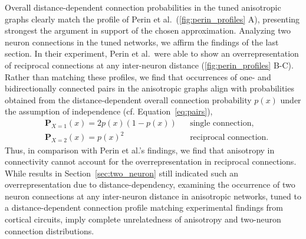 Overall distance-dependent connection probabilities in the tuned
an\-iso\-tro\-pic graphs clearly match the profile of Perin et
al.~(\autoref{fig:perin_profiles} A), presenting strongest the
argument in support of the chosen approximation. Analyzing two neuron
connections  in the tuned
networks, we affirm the findings of the last section. In their
experiment, Perin et al.~were able to show an overrepresentation of
reciprocal connections at any inter-neuron distance
(\autoref{fig:perin_profiles} B-C). Rather than matching these
profiles, we find that occurrences of one- and bidirectionally
connected pairs in the anisotropic graphs align with probabilities
obtained from the distance-dependent overall connection probability
$p(x)$ under the assumption of independence (cf. Equation~\ref{eq:pairs}),
\begin{equation*}
  \label{eq:pairs}
  \begin{aligned}%
    & \mathbf{P}_{X=1}(x) = 2p(x) \left(1-p(x) \right)    
      && \text{single connection,}\\
    & \mathbf{P}_{X=2}(x) = p(x)^2        
      &&\text{reciprocal connection.}
  \end{aligned}%
\end{equation*}%
\vspace{0.1cm}%
Thus, in comparison with Perin et al.'s findings, we find that
anisotropy in connectivity cannot account for the overrepresentation
in reciprocal connections. While results in
Section~\ref{sec:two_neuron} still indicated such an
overrepresentation due to distance-dependency, examining the
occurrence of two neuron connections at any inter-neuron distance in
anisotropic networks, tuned to a distance-dependent connection profile
matching experimental findings from cortical circuits, imply complete
unrelatedness of anisotropy and two-neuron connection distributions.

